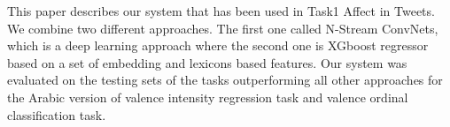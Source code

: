This paper describes our system that has been used in Task1 Affect in Tweets. We combine two different approaches. The first one called N-Stream ConvNets, which is a deep learning approach where the second one is XGboost regressor based on a set of embedding and lexicons based features. Our system was evaluated on the testing sets of the tasks outperforming all other approaches for the Arabic version of valence intensity regression task and valence ordinal classification task.
